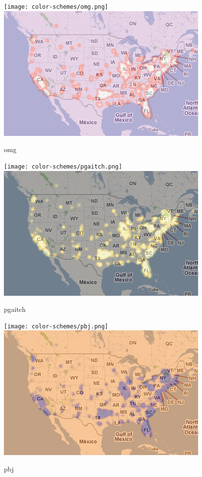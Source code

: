 \documentclass{manual}
\begin{document}
\begin{figure}[htp]
\texttt{[image: color-schemes/omg.png]}
\includegraphics[bb=0 0 400 256]{img/cs-omg.png}
\caption{omg}\label{fig:omg}
\end{figure}

\begin{figure}[htp]
\texttt{[image: color-schemes/pgaitch.png]}
\includegraphics[bb=0 0 400 256]{img/cs-pgaitch.png}
\caption{pgaitch}\label{fig:pgaitch}
\end{figure}

\begin{figure}[htp]
\texttt{[image: color-schemes/pbj.png]}
\includegraphics[bb=0 0 400 256]{img/cs-pbj.png}
\caption{pbj}\label{fig:pbj}
\end{figure}
\end{document}
